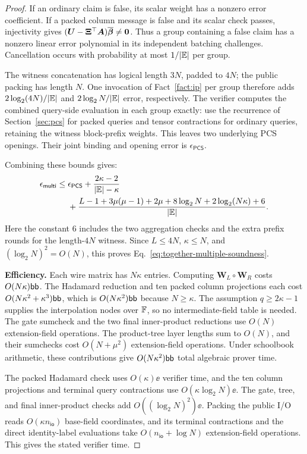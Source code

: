 \begin{proof}
If an ordinary claim is false, its scalar weight has a nonzero
error coefficient.
If a packed column message is false and its scalar check passes,
injectivity gives
\((\bm U-\bm\Xi^\top\bm A)\overline{\bm\beta}\ne\bm0\).
Thus a group containing a false claim has a nonzero linear
error polynomial in its independent batching challenges.
Cancellation occurs with probability at most
\(1/|\mathbb{E}|\) per group.

The witness concatenation has logical length \(3N\), padded
to \(4N\); the public packing has length \(N\).
One invocation of Fact~\ref{fact:ip} per group therefore adds
\(2\log_2(4N)/|\mathbb{E}|\) and
\(2\log_2N/|\mathbb{E}|\) error, respectively.
The verifier computes the combined query-side evaluation in
each group exactly: use the recurrence of Section~\ref{sec:pcs}
for packed queries and tensor contractions for ordinary
queries, retaining the witness block-prefix weights.
This leaves two underlying PCS openings.
Their joint binding and opening error is
\(\epsilon_{\mathsf{PCS}}\).

Combining these bounds gives:
\[
\begin{aligned}
    \epsilon_{\mathsf{multi}}
    \leq{}&\epsilon_{\mathsf{PCS}}
       +\frac{2\kappa-2}{|\mathbb{E}|-\kappa}\\
       &+\frac{
          L-1+3\mu(\mu-1)+2\mu
          +8\log_2N+2\log_2(N\kappa)+6
       }{|\mathbb{E}|}.
\end{aligned}
\]
Here the constant \(6\) includes the two aggregation checks
and the extra prefix rounds for the length-\(4N\) witness.
Since \(L\leq4N\), \(\kappa\leq N\), and
\((\log_2N)^2=O(N)\), this proves
Eq.~\eqref{eq:together-multiple-soundness}.

\smallskip\noindent\textbf{Efficiency.}
Each wire matrix has \(N\kappa\) entries.
Computing \(\bm W_L\circ\bm W_R\) costs \(O(N\kappa)\mathsf{bb}\).
The Hadamard reduction and ten packed column projections each
cost \(O(N\kappa^2+\kappa^3)\mathsf{bb}\), which is
\(O(N\kappa^2)\mathsf{bb}\) because \(N\geq\kappa\).
The assumption \(q\geq2\kappa-1\) supplies the interpolation
nodes over \({\mathbb{F}}\), so no intermediate-field table is needed.
The gate sumcheck and the two final inner-product reductions
use \(O(N)\) extension-field operations.
The product-tree layer lengths sum to \(O(N)\), and their
sumchecks cost \(O(N+\mu^2)\) extension-field operations.
Under schoolbook arithmetic, these contributions give
\(O(N\kappa^2)\mathsf{bb}\) total algebraic prover time.

The packed Hadamard check uses \(O(\kappa)\ee\) verifier time,
and the ten column projections and terminal query contractions
use \(O(\kappa\log_2N)\ee\).
The gate, tree, and final inner-product checks add
\(O((\log_2N)^2)\ee\).
Packing the public I/O reads \(O(\kappa n_{\mathsf{io}})\)
base-field coordinates, and its terminal contractions and
the direct identity-label evaluations take
\(O(n_{\mathsf{io}}+\log N)\) extension-field operations.
This gives the stated verifier time.


\end{proof}
